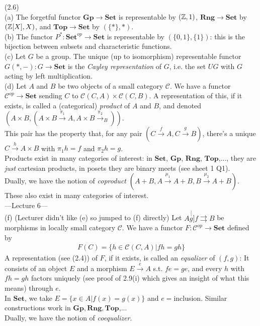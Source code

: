 \documentclass[a4paper]{article}
\begin{document}
\begin{eg} (2.6)\\
    (a) The forgetful functor $\mathbf{Gp} \to \mathbf{Set}$ is representable by $(\mathbb{Z},1)$, $\mathbf{Rng} \to \mathbf{Set}$ by $(\mathbb{Z}[X],X)$, and $\mathbf{Top} \to \mathbf{Set}$ by $(\{*\},*)$.\\
    (b) The functor $P^*: \mathbf{Set}^{op} \to \mathbf{Set}$ is representable by $(\{0,1\},\{1\})$: this is the bijection between subsets and characteristic functions.\\
    (c) Let $G$ be a group. The unique (up to isomorphism) representable functor $G(*,-): G \to \mathbf{Set}$ is the \emph{Cayley representation} of $G$, i.e. the set $UG$ with $G$ acting by left multiplication.\\
    (d) Let $A$ and $B$ be two objects of a small category $\mathcal{C}$. We have a functor $\mathcal{C}^{op} \to \mathbf{Set}$ sending $C$ to $\mathcal{C}(C,A) \times \mathcal{C}(C,B)$. A representation of this, if it exists, is called a (categorical) \emph{product} of $A$ and $B$, and denoted $(A \times B,(A \times B \xrightarrow{\pi_1} A, A \times B \xrightarrow{\pi_2}_B))$.\\
    This pair has the property that, for any pair $(C \xrightarrow{f}A,C\xrightarrow{g}B)$, there's a unique $C \xrightarrow{h} A \times B$ with $\pi_1 h = f$ and $\pi_2 h = g$.\\
    Products exist in many categories of interest: in $\mathbf{Set}$, $\mathbf{Gp}$, $\mathbf{Rng}$, $\mathbf{Top}$,..., they are \emph{just} cartesian products, in posets they are binary meets (see sheet 1 Q1).\\
    Dually, we have the notion of \emph{coproduct} $(A+B,A \xrightarrow{\mu_1} A + B, B \xrightarrow{\mu_2}A+B)$.\\
    These also exist in many categories of interest.\\
    ---Lecture 6---\\
    (f) (Lecturer didn't like (e) so jumped to (f) directly) Let $A \stackrel[g]{f}{\rightrightarrows} B$ be morphisms in locally small category $\mathcal{C}$. We have a functor $F:\mathcal{C}^{op} \to \mathbf{Set}$ defined by 
    \begin{equation*}
        \begin{aligned}
            F(C) = \{h \in \mathcal{C}(C,A) | fh = gh\}
        \end{aligned}
    \end{equation*}
    A representation (see (2.4)) of $F$, if it exists, is called an \emph{equalizer} of $(f,g)$: It consists of an object $E$ and a morphism $E \xrightarrow{e} A$ s.t. $fe=ge$, and every $h$ with $fh=gh$ factors uniquely (see proof of 2.9(i) which gives an insight of what this means) through $e$.\\
    In $\mathbf{Set}$, we take $E = \{x \in A | f(x) = g(x) \}$ and $e=$inclusion. Similar constructions work in $\mathbf{Gp},\mathbf{Rng},\mathbf{Top}$,...\\
    Dually, we have the notion of \emph{coequalizer}.
\end{eg}
\end{document}
